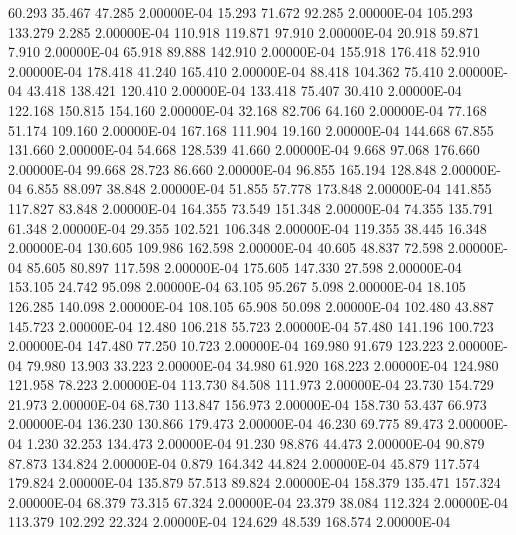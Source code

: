     60.293    35.467    47.285  2.00000E-04
    15.293    71.672    92.285  2.00000E-04
   105.293   133.279     2.285  2.00000E-04
   110.918   119.871    97.910  2.00000E-04
    20.918    59.871     7.910  2.00000E-04
    65.918    89.888   142.910  2.00000E-04
   155.918   176.418    52.910  2.00000E-04
   178.418    41.240   165.410  2.00000E-04
    88.418   104.362    75.410  2.00000E-04
    43.418   138.421   120.410  2.00000E-04
   133.418    75.407    30.410  2.00000E-04
   122.168   150.815   154.160  2.00000E-04
    32.168    82.706    64.160  2.00000E-04
    77.168    51.174   109.160  2.00000E-04
   167.168   111.904    19.160  2.00000E-04
   144.668    67.855   131.660  2.00000E-04
    54.668   128.539    41.660  2.00000E-04
     9.668    97.068   176.660  2.00000E-04
    99.668    28.723    86.660  2.00000E-04
    96.855   165.194   128.848  2.00000E-04
     6.855    88.097    38.848  2.00000E-04
    51.855    57.778   173.848  2.00000E-04
   141.855   117.827    83.848  2.00000E-04
   164.355    73.549   151.348  2.00000E-04
    74.355   135.791    61.348  2.00000E-04
    29.355   102.521   106.348  2.00000E-04
   119.355    38.445    16.348  2.00000E-04
   130.605   109.986   162.598  2.00000E-04
    40.605    48.837    72.598  2.00000E-04
    85.605    80.897   117.598  2.00000E-04
   175.605   147.330    27.598  2.00000E-04
   153.105    24.742    95.098  2.00000E-04
    63.105    95.267     5.098  2.00000E-04
    18.105   126.285   140.098  2.00000E-04
   108.105    65.908    50.098  2.00000E-04
   102.480    43.887   145.723  2.00000E-04
    12.480   106.218    55.723  2.00000E-04
    57.480   141.196   100.723  2.00000E-04
   147.480    77.250    10.723  2.00000E-04
   169.980    91.679   123.223  2.00000E-04
    79.980    13.903    33.223  2.00000E-04
    34.980    61.920   168.223  2.00000E-04
   124.980   121.958    78.223  2.00000E-04
   113.730    84.508   111.973  2.00000E-04
    23.730   154.729    21.973  2.00000E-04
    68.730   113.847   156.973  2.00000E-04
   158.730    53.437    66.973  2.00000E-04
   136.230   130.866   179.473  2.00000E-04
    46.230    69.775    89.473  2.00000E-04
     1.230    32.253   134.473  2.00000E-04
    91.230    98.876    44.473  2.00000E-04
    90.879    87.873   134.824  2.00000E-04
     0.879   164.342    44.824  2.00000E-04
    45.879   117.574   179.824  2.00000E-04
   135.879    57.513    89.824  2.00000E-04
   158.379   135.471   157.324  2.00000E-04
    68.379    73.315    67.324  2.00000E-04
    23.379    38.084   112.324  2.00000E-04
   113.379   102.292    22.324  2.00000E-04
   124.629    48.539   168.574  2.00000E-04
